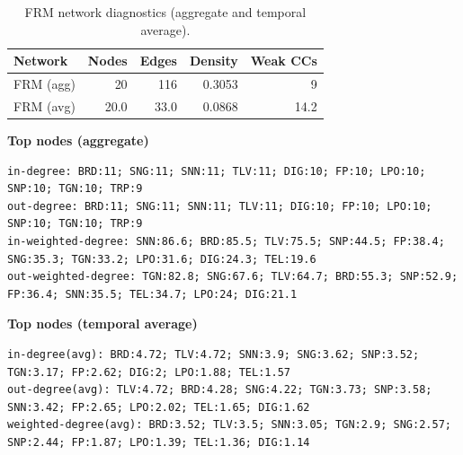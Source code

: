 \begin{table}[ht]
\centering
\small
\begin{tabular}{l r r r r}
\hline
Network & Nodes & Edges & Density & Weak CCs \\
\hline
FRM (agg) & 20 & 116 & 0.3053 & 9 \\
FRM (avg) & 20.0 & 33.0 & 0.0868 & 14.2 \\
\hline
\end{tabular}
\caption{FRM network diagnostics (aggregate and temporal average).}
\label{tab:frm_network_summary}
\end{table}

\noindent\textbf{Top nodes (aggregate)}\\
\begin{verbatim}
in-degree: BRD:11; SNG:11; SNN:11; TLV:11; DIG:10; FP:10; LPO:10; SNP:10; TGN:10; TRP:9
out-degree: BRD:11; SNG:11; SNN:11; TLV:11; DIG:10; FP:10; LPO:10; SNP:10; TGN:10; TRP:9
in-weighted-degree: SNN:86.6; BRD:85.5; TLV:75.5; SNP:44.5; FP:38.4; SNG:35.3; TGN:33.2; LPO:31.6; DIG:24.3; TEL:19.6
out-weighted-degree: TGN:82.8; SNG:67.6; TLV:64.7; BRD:55.3; SNP:52.9; FP:36.4; SNN:35.5; TEL:34.7; LPO:24; DIG:21.1
\end{verbatim}

\noindent\textbf{Top nodes (temporal average)}\\
\begin{verbatim}
in-degree(avg): BRD:4.72; TLV:4.72; SNN:3.9; SNG:3.62; SNP:3.52; TGN:3.17; FP:2.62; DIG:2; LPO:1.88; TEL:1.57
out-degree(avg): TLV:4.72; BRD:4.28; SNG:4.22; TGN:3.73; SNP:3.58; SNN:3.42; FP:2.65; LPO:2.02; TEL:1.65; DIG:1.62
weighted-degree(avg): BRD:3.52; TLV:3.5; SNN:3.05; TGN:2.9; SNG:2.57; SNP:2.44; FP:1.87; LPO:1.39; TEL:1.36; DIG:1.14
\end{verbatim}
